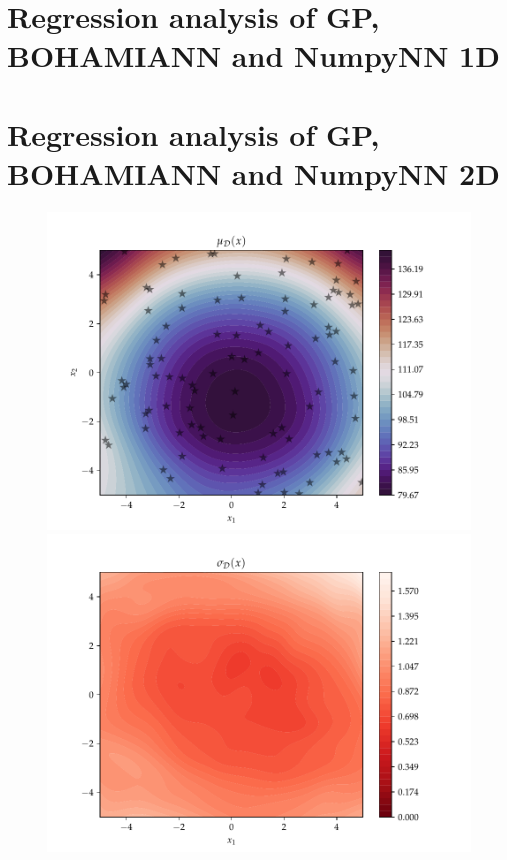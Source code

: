 \section{Regression analysis of GP, BOHAMIANN and NumpyNN 1D}

\section{Regression analysis of GP, BOHAMIANN and NumpyNN 2D}

\begin{figure}[h]
  \centering
  \begin{minipage}[b]{0.49\textwidth}
   \includegraphics[trim=1.2cm 0.7cm 2cm 1cm,clip,width=\textwidth]{Figures/coco_reg/f1_BOHAMIANN2.pdf}
  \end{minipage}
  \hfill
  \begin{minipage}[b]{0.49\textwidth}
    \includegraphics[trim=1.2cm 0.7cm 2cm 1cm,clip,width=\textwidth]{Figures/coco_reg/f1_BOHAMIANN3.pdf}
   \end{minipage}
  

\end{figure}
